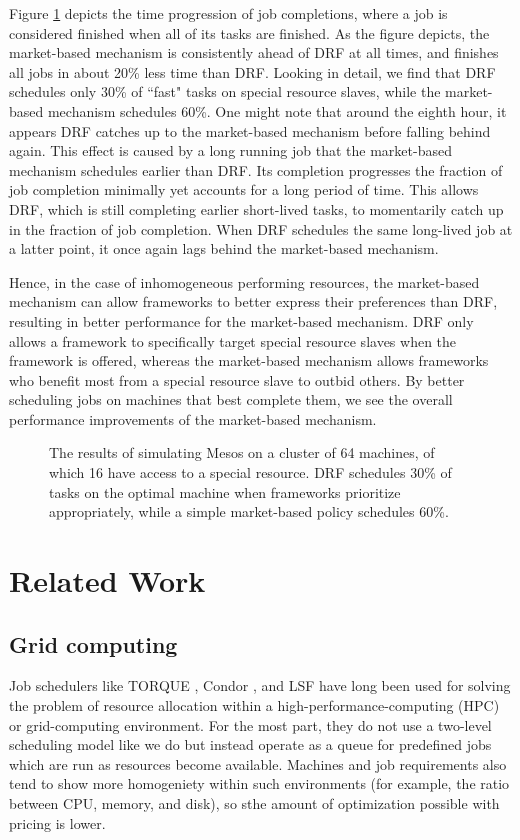 \documentclass{acm_proc_article-sp}
\begin{document}
Figure \ref{img:inhomo} depicts the time progression of job completions, where a job is considered finished when all of its tasks are finished. As the figure depicts, the market-based mechanism is consistently ahead of DRF at all times, and finishes all jobs in about 20\% less time than DRF. Looking in detail, we find that DRF schedules only 30\% of ``fast" tasks on special resource slaves, while the market-based mechanism schedules 60\%. One might note that around the eighth hour, it appears DRF catches up to the market-based mechanism before falling behind again. This effect is caused by a long running job that the market-based mechanism schedules earlier than DRF. Its completion progresses the fraction of job completion minimally yet accounts for a long period of time. This allows DRF, which is still completing earlier short-lived tasks, to momentarily catch up in the fraction of job completion. When DRF schedules the same long-lived job at a latter point, it once again lags behind the market-based mechanism.

Hence, in the case of inhomogeneous performing resources, the market-based mechanism can allow frameworks to better express their preferences than DRF, resulting in better performance for the market-based mechanism. DRF only allows a framework to specifically target special resource slaves when the framework is offered, whereas the market-based mechanism allows frameworks who benefit most from a special resource slave to outbid others. By better scheduling jobs on machines that best complete them, we see the overall performance improvements of the market-based mechanism.


\begin{figure}
\caption{The results of simulating Mesos on a cluster of 64 machines, of which 16 have access to a special resource. DRF schedules 30\% of tasks on the optimal machine when frameworks prioritize appropriately, while a simple market-based policy schedules 60\%.}
\label{img:inhomo}
\end{figure}


\section{Related Work}
\label{sec:related}

\subsection{Grid computing}
Job schedulers like TORQUE \cite{torque}, Condor \cite{condor}, and LSF
\cite{lsf} have long been used for solving the problem of resource allocation
within a high-performance-computing (HPC) or grid-computing environment.
For the most part, they do not use a two-level scheduling model like we do but
instead operate as a queue for predefined jobs which are run as resources become
available. Machines and job requirements also tend to show more homogeniety
within such environments (for example, the ratio between CPU, memory, and disk),
so sthe amount of optimization possible with pricing is lower.
\end{document}
